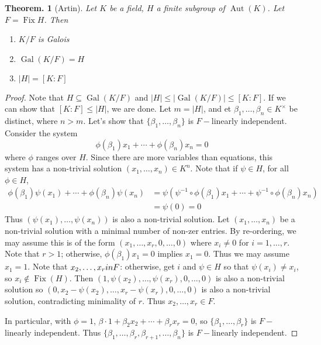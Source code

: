 \documentclass[11pt, a4paper]{memoir}
\theoremstyle{change}
\newtheorem{theorem}{Theorem.}[section]
\theoremstyle{plain}
\theoremstyle{nonumberplain}
\newtheorem{proof}{Proof}
\DeclareMathOperator{\Aut}{Aut}
\DeclareMathOperator{\Fix}{Fix}
\DeclareMathOperator{\Gal}{Gal}
\numberwithin{equation}{section}
\begin{document}
\begin{theorem}[Artin]
    Let $K$ be a field, $H$ a finite subgroup of $\Aut(K)$.
    Let $F=\Fix H$.
    Then
    \begin{enumerate}[nolistsep]
        \item $K/F$ is Galois
        \item $\Gal(K/F)=H$
        \item $|H|=[K:F]$
    \end{enumerate}
\end{theorem}
\begin{proof}
    Note that $H\subseteq\Gal(K/F)$ and $|H|\leq|\Gal(K/F)|\leq[K:F]$.
    If we can show that $[K:F]\leq |H|$, we are done.
    Let $m=|H|$, and et $\beta_1,\ldots,\beta_n\in K^\times$ be distinct, where $n>m$.
    Let's show that $\{\beta_1,\ldots,\beta_n\}$ is $F-$linearly independent.
    Consider the system
   \begin{equation*}
        \phi(\beta_1)x_1+\cdots+\phi(\beta_n)x_n=0
    \end{equation*}
    where $\phi$ ranges over $H$.
    Since there are more variables than equations, this system has a non-trivial solution $(x_1,\ldots,x_n)\in K^n$.
    Note that if $\psi\in H$, for all $\phi\in H$,
    \begin{align*}
        \phi(\beta_1)\psi(x_1)+\cdots+\phi(\beta_n)\psi(x_n) &=\psi(\psi^{-1}\circ\phi(\beta_1)x_1+\cdots+\psi^{-1}\circ\phi(\beta_n)x_n)\\
                                                             &= \psi(0)=0
    \end{align*}
    Thus $(\psi(x_1),\ldots,\psi(x_n))$ is also a non-trivial solution.
    Let $(x_1,\ldots,x_n)$ be a non-trivial solution with a minimal number of non-zer entries.
    By re-ordering, we may assume this is of the form $(x_1,\ldots,x_r,0,\ldots,0)$ where $x_i\neq 0$ for $i=1,\ldots,r$.
    Note that $r>1$; otherwise, $\phi(\beta_1)x_1=0$ implies $x_1=0$.
    Thus we may assume $x_1=1$.
    Note that $x_2,\ldots,x_r\\in F$: otherwise, get $i$ and $\psi\in H$ so that $\psi(x_i)\neq x_i$, so $x_i\notin\Fix(H)$.
    Then $(1,\psi(x_2),\ldots,\psi(x_r),0,\ldots,0)$ is also a non-trivial solution so $(0,x_2-\psi(x_2),\ldots,x_r-\psi(x_r),0,\ldots,0)$ is also a non-trivial solution, contradicting minimality of $r$.
    Thus $x_2,\ldots,x_r\in F$.

    In particular, with $\phi=1$, $\beta\cdot 1+\beta_2x_2+\cdots+\beta_rx_r=0$, so $\{\beta_1,\ldots,\beta_r\}$ is $F-$linearly independent.
    Thus $\{\beta_1,\ldots,\beta_r,\beta_{r+1},\ldots,\beta_n\}$ is $F-$linearly independent.
\end{proof}
\end{document}
